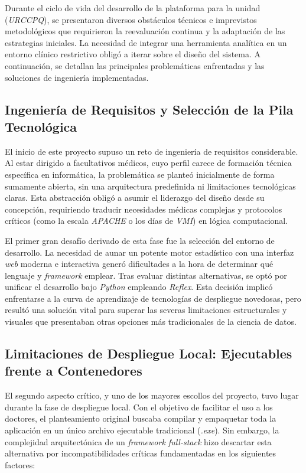 Durante el ciclo de vida del desarrollo de la plataforma para la unidad (\textit{URCCPQ}), se presentaron diversos obstáculos técnicos e imprevistos metodológicos que requirieron la reevaluación continua y la adaptación de las estrategias iniciales. La necesidad de integrar una herramienta analítica en un entorno clínico restrictivo obligó a iterar sobre el diseño del sistema. A continuación, se detallan las principales problemáticas enfrentadas y las soluciones de ingeniería implementadas.

\subsection{Ingeniería de Requisitos y Selección de la Pila Tecnológica}
El inicio de este proyecto supuso un reto de ingeniería de requisitos considerable. Al estar dirigido a facultativos médicos, cuyo perfil carece de formación técnica específica en informática, la problemática se planteó inicialmente de forma sumamente abierta, sin una arquitectura predefinida ni limitaciones tecnológicas claras. Esta abstracción obligó a asumir el liderazgo del diseño desde su concepción, requiriendo traducir necesidades médicas complejas y protocolos críticos (como la escala \textit{APACHE} o los días de \textit{VMI}) en lógica computacional.

El primer gran desafío derivado de esta fase fue la selección del entorno de desarrollo. La necesidad de aunar un potente motor estadístico con una interfaz \textit{web} moderna e interactiva generó dificultades a la hora de determinar qué lenguaje y \textit{framework} emplear. Tras evaluar distintas alternativas, se optó por unificar el desarrollo bajo \textit{Python} empleando \textit{Reflex}. Esta decisión implicó enfrentarse a la curva de aprendizaje de tecnologías de despliegue novedosas, pero resultó una solución vital para superar las severas limitaciones estructurales y visuales que presentaban otras opciones más tradicionales de la ciencia de datos.

\subsection{Limitaciones de Despliegue Local: Ejecutables frente a Contenedores}
El segundo aspecto crítico, y uno de los mayores escollos del proyecto, tuvo lugar durante la fase de despliegue local. Con el objetivo de facilitar el uso a los doctores, el planteamiento original buscaba compilar y empaquetar toda la aplicación en un único archivo ejecutable tradicional (\textit{.exe}). Sin embargo, la complejidad arquitectónica de un \textit{framework full-stack} hizo descartar esta alternativa por incompatibilidades críticas fundamentadas en los siguientes factores:

